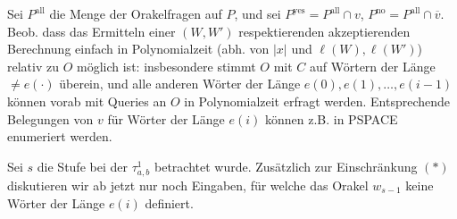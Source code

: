 \documentclass[nofonts]{uebung}
\theoremstyle{definition}
\begin{document}
Sei $P^\mathrm{all}$ die Menge der Orakelfragen auf $P$, und sei $P^\mathrm{yes}=P^\mathrm{all}\cap v$, $P^\mathrm{no}=P^\mathrm{all}\cap \overline{v}$.
Beob. dass  das Ermitteln einer $(W, W')$ respektierenden akzeptierenden Berechnung einfach in Polynomialzeit (abh. von $|x|$ und $\ell(W),\ell(W')$) relativ zu $O$ möglich ist: insbesondere stimmt $O$ mit $C$ auf Wörtern der Länge $\neq e(\cdot)$ überein, und alle anderen Wörter der Länge $e(0), e(1), \dots, e(i-1)$ können vorab mit Queries an $O$ in Polynomialzeit erfragt werden.
Entsprechende Belegungen von $v$ für Wörter der Länge $e(i)$ können z.B. in PSPACE enumeriert werden.

Sei $s$ die Stufe bei der $\tau^1_{a,b}$ betrachtet wurde.
Zusätzlich zur Einschränkung $(\ast)$ diskutieren wir ab jetzt nur noch Eingaben, für welche das Orakel $w_{s-1}$ keine Wörter der Länge $e(i)$ definiert.
\end{document}
